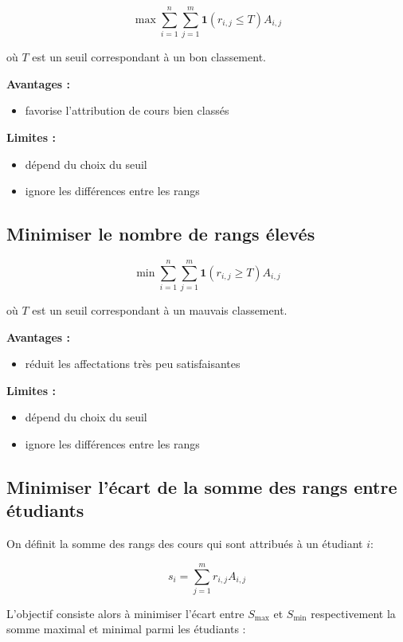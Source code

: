\documentclass[11pt]{article}
\begin{document}
\[
\max \sum_{i=1}^{n}\sum_{j=1}^{m} \mathbf{1}(r_{i,j} \leq T) A_{i,j}
\]

où $T$ est un seuil correspondant à un bon classement.

\textbf{Avantages :}

\begin{itemize}
\item favorise l'attribution de cours bien classés
\end{itemize}

\textbf{Limites :}

\begin{itemize}
\item dépend du choix du seuil
\item ignore les différences entre les rangs
\end{itemize}

\subsection{Minimiser le nombre de rangs élevés}

\[
\min \sum_{i=1}^{n}\sum_{j=1}^{m} \mathbf{1}(r_{i,j} \geq T) A_{i,j}
\]

où $T$ est un seuil correspondant à un mauvais classement.

\textbf{Avantages :}

\begin{itemize}
\item réduit les affectations très peu satisfaisantes
\end{itemize}

\textbf{Limites :}

\begin{itemize}
\item dépend du choix du seuil
\item ignore les différences entre les rangs
\end{itemize}

\subsection{Minimiser l'écart de la somme des rangs entre étudiants}

On définit la somme des rangs des cours qui sont attribués à un étudiant $i$:

\[
s_i = \sum_{j=1}^{m} r_{i,j} A_{i,j}
\]

L'objectif consiste alors à minimiser l'écart entre $S_{\max}$ et $S_{\min}$ respectivement la somme maximal et minimal parmi les étudiants :
\end{document}
